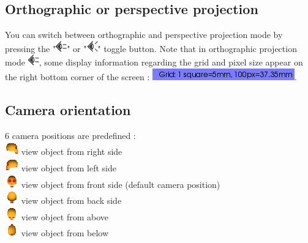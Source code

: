  
\subsection{Orthographic or perspective projection}
You can switch between orthographic and perspective projection mode by pressing the "\includegraphics[scale=0.7]{images/06/camera/camera_ortho.png}" or "\includegraphics[scale=0.7]{images/06/camera/camera_persp}" toggle button.
Note that in orthographic projection mode \includegraphics[scale=0.7]{images/06/camera/camera_ortho.png}, some display information regarding the grid and pixel size appear on the right bottom corner of the screen : \includegraphics[scale=0.7]{images/06/camera/grid_infos.png}. 


\subsection{Camera orientation}
6 camera positions are predefined :\\
\includegraphics[scale=0.7]{images/06/camera/camera_right.png} view object from right side \\
\includegraphics[scale=0.7]{images/06/camera/camera_left.png} view object from left side\\
\includegraphics[scale=0.7]{images/06/camera/camera_front.png} view object from front side (default camera position)\\
\includegraphics[scale=0.7]{images/06/camera/camera_back.png} view object from back side\\
\includegraphics[scale=0.7]{images/06/camera/camera_above.png} view object from above\\
\includegraphics[scale=0.7]{images/06/camera/camera_below.png} view object from below\\

